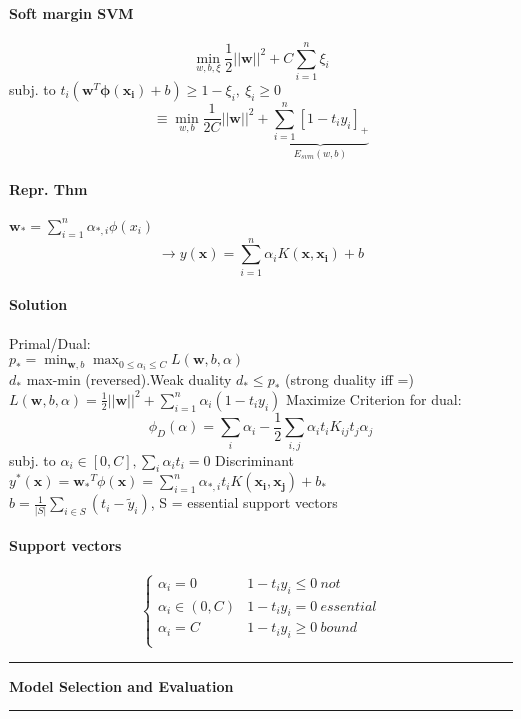 \documentclass[7pt]{scrartcl}
\newlength{\secskip}
\renewcommand{\section}[1]{
  \vspace{\secskip}
  \hrule\vspace{.3em}
  \textbf{#1}
  \vspace{.3em}
  \hrule
  \vspace{\secskip}
}
\renewcommand{\vec}{\mathbf}
\begin{document}
\begin{multicols}{4}
\paragraph{Soft margin SVM}
\[\min_{w,b,\xi} \frac{1}{2}||\vec{w}||^2 + C \sum_{i=1}^n \xi_i\]
subj. to $t_i(\vec{w}^T \vec{\phi(x_i)} + b) \geq 1-\xi_i,~ \xi_i \geq 0$
\[\equiv \min_{w,b} \frac{1}{2C}||\vec{w}||^2 + \underbrace{\sum_{i=1}^n [1-t_iy_i]_+}_{E_{svm}(w,b)}\]
\paragraph{Repr. Thm}
$\vec{w_*} = \sum_{i=1}^n \alpha_{*,i} \phi(x_i)$
\[\rightarrow y(\vec{x}) = \sum_{i=1}^n \alpha_i K(\vec{x},\vec{x_i})+b\]
\paragraph{Solution}
Primal/Dual: \\
$p_* = \min_{\vec{w},b} \max_{0 \leq \alpha_i \leq C} L(\vec{w},b,\alpha)$\\
$d_*$ max-min (reversed).Weak duality $d_* \leq p_*$ (strong duality iff =)\\
$L(\vec{w},b,\alpha) = \frac{1}{2}||\vec{w}||^2 + \sum_{i=1}^n \alpha_i(1-t_iy_i)$
Maximize Criterion for dual:
\[\phi_D(\alpha) = \sum_i \alpha_i - \frac{1}{2} \sum_{i,j} \alpha_i t_i K_{ij} t_j \alpha_j\] subj. to $\alpha_i \in [0,C], \sum_i \alpha_it_i = 0$
Discriminant $y^*(\vec{x}) = \vec{w_*}^T \phi(\vec{x}) = \sum_{i=1}^n \alpha_{*,i} t_i K(\vec{x_i},\vec{x_j}) + b_*$\\
$b = \frac{1}{|S|} \sum_{i \in S} (t_i - \tilde{y}_i)$, S = essential support vectors
\paragraph{Support vectors}
\begin{equation*}
\left\lbrace
\begin{array}{ll}
\alpha_i = 0 & 1-t_iy_i \leq 0 ~not \\
\alpha_i \in (0,C) & 1-t_iy_i = 0 ~essential\\
\alpha_i = C & 1-t_iy_i \geq 0 ~bound\\
\end{array}
\right.
\end{equation*}

\section{Model Selection and Evaluation}

\end{multicols}
\end{document}

